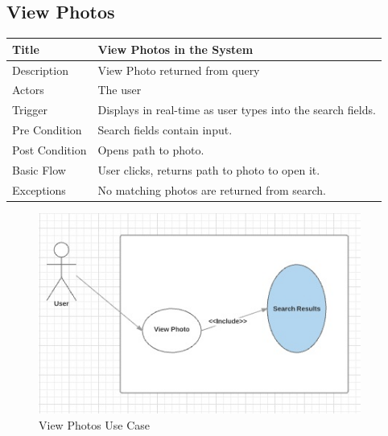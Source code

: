 \newpage

\subsection{View Photos}
  \begin{table}[h!]
    \begin{tabularx}{\textwidth}{|l|X|}
      \hline
      Title       & View Photos in the System \\ \hline
      Description & View Photo returned from query\\ \hline
      Actors & The user\\ \hline
      Trigger & Displays in real-time as user types into the search fields.\\ \hline
      Pre Condition & Search fields contain input.\\ \hline
      Post Condition & Opens path to photo.\\ \hline
      Basic Flow & User clicks, returns path to photo to open it.  \\ \hline
      Exceptions    &   No matching photos are returned from search. \\ \hline
    \end{tabularx}
  \end{table}

\begin{figure}[h!]
  \begin{center}
    \caption{View Photos Use Case}
    \label{}
    \includegraphics[width=400px]{images/ViewPhotosUC.jpg}
  \end{center}
\end{figure}

\newpage
